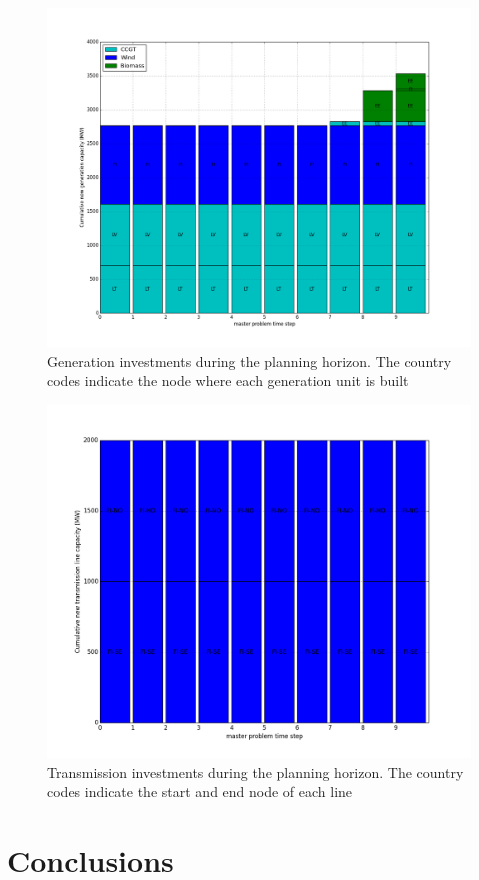 \documentclass[final]{IEEEtran}
\begin{document}
\begin{figure}[htpb]
	\centering
	\includegraphics[width=\linewidth]{generation_investment_milp_dc_miqp_dc.png}
	\caption{Generation investments during the planning horizon. The country codes indicate the node where each generation unit is built}
	\label{fig_generation_investment}
\end{figure}

\begin{figure}[htpb]
	\centering
	\includegraphics[width=\linewidth]{transmission_investment_milp_dc_miqp_dc.png}
	\caption{Transmission investments during the planning horizon. The country codes indicate the start and end node of each line}
	\label{fig_transmission_investment}
\end{figure}

\section{Conclusions}
\label{section_conclusions}




\end{document}

